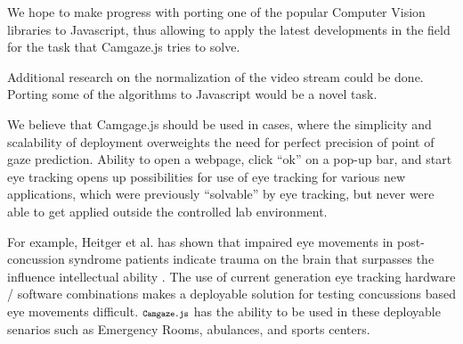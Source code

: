 \documentclass[annual]{acmsiggraph}
\newcommand{\Acronym}[1]{\ensuremath{{\small{\texttt{#1}}}}}
\newcommand{\Name}{\Acronym{Camgaze.js}} \newcommand{\False}{\Constant{false}}
\newcommand{\Constant}[1]{\ensuremath{\small{\texttt{#1}}}}
\begin{document}
We hope to make progress with porting one of the popular Computer Vision
libraries to Javascript, thus allowing to apply the latest developments in the
field for the task that Camgaze.js tries to solve.

Additional research on the normalization of the video stream could be done.
Porting some of the algorithms to Javascript would be a novel task. 

We believe that Camgage.js should be used in cases, where the simplicity and
scalability of deployment overweights the need for perfect precision of point
of gaze prediction. Ability to open a webpage, click “ok” on a pop-up bar, and
start eye tracking opens up possibilities for use of eye tracking for various
new applications, which were previously “solvable” by eye tracking, but never
were able to get applied outside the controlled lab environment.

For example, Heitger et al. has shown that impaired eye movements in
post-concussion syndrome patients indicate trauma on the brain that surpasses
the influence intellectual ability \cite{Heitger2009}. The use of current
generation eye tracking hardware / software combinations makes a deployable
solution for testing concussions based eye movements difficult. $\Name$ has the
ability to be used in these deployable senarios such as Emergency Rooms,
abulances, and sports centers.



\end{document}

